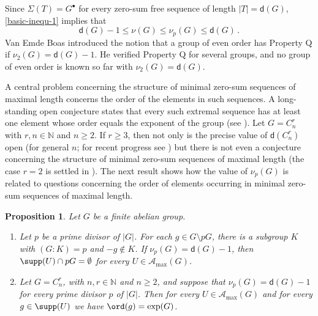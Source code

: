 \documentclass[a4paper, 10pt]{amsart}
\theoremstyle{plain}
\newtheorem{proposition}[theorem]{\bf Proposition}
\theoremstyle{definition}
\newcommand{\N}{\mathbb N}
\numberwithin{equation}{section}
\begin{document}
Since $\Sigma (T) = G^{\bullet}$ for every zero-sum free sequence of length $|T|= \mathsf d (G)$, \eqref{basic-inequ-1} implies that
\begin{equation} \label{basic-inequ-2}
\mathsf d (G) -1 \le \nu (G) \le \nu_p (G) \le \mathsf d (G) \,.
\end{equation}
Van Emde Boas \cite{Em69a} introduced the notion that a group of even order has Property Q if $\nu_2 (G) = \mathsf d (G)-1$. He verified Property Q for several groups, and
no group of even order is known so far with $\nu_2 (G) = \mathsf d (G)$. 

\medskip
A central problem concerning the structure of minimal zero-sum sequences of maximal length concerns the order of the elements in such sequences. A long-standing open conjecture states that every such extremal sequence has at least  one element whose order equals the exponent of the group (see \cite[Appendix B, Problem 4]{Ge-Gr-Zh26a}). Let $G =C_n^r$ with $r, n \in \N$ and $n \ge 2$. If $r \ge 3$, then not only is the precise value of $\mathsf d (C_n^r)$ open (for general $n$; for recent progress see \cite{Gi18a}) but there is not even a conjecture concerning the structure of minimal zero-sum sequences of maximal length (the case $r=2$ is settled in \cite[Chapter 4]{Ge-Gr-Zh26a}). The next result shows how the value of $\nu_p (G)$ is related to questions concerning the order of elements occurring in minimal zero-sum sequences of maximal length.

\begin{proposition} \label{3.2}
Let $G $ be a finite abelian group.   
\begin{enumerate}
\item Let $p$ be a prime divisor of $|G|$. For each $g\in G\setminus pG$,  there is a subgroup $K$ with  $ (G:K)=p$ and $-g \notin  K$. If $\nu_p(G)=\mathsf d (G)-1$, then $\supp (U) \cap pG = \emptyset$ for every $U \in \mathcal A_{\max} (G)$.

\item Let $G = C_n^r$,  with $n, r \in \N$ and $n \ge 2$, and suppose that $\nu_p (G) = \mathsf d (G)-1$ for every prime divisor $p$ of $|G|$. Then for every $U \in \mathcal A_{\max} (G)$ and for every $g \in \supp (U)$ we have $\ord (g) = \exp (G)$.
\end{enumerate}
\end{proposition}
\end{document}
